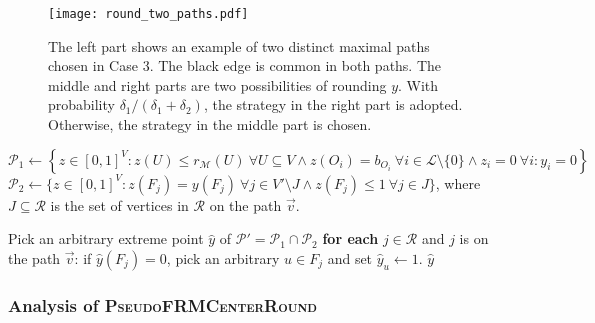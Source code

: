 \documentclass[a4paper,11pt]{article}
\newcommand{\R}{\mathcal{R}}
\newcommand{\M}{\mathcal{M}}
\renewcommand{\L}{\mathcal{L}}
\renewcommand{\P}{\mathcal{P}}
\begin{document}
\begin{figure}[H]
\centering
\texttt{[image: round\_two\_paths.pdf]}
        \caption{The left part shows an example of two distinct maximal paths chosen in Case 3. The black edge is common in both paths. The middle and right parts are two possibilities of rounding $y$. With probability $\delta_1/(\delta_1+\delta_2)$, the strategy in the right part is adopted. Otherwise, the strategy in the middle part is chosen.}
        \label{fig:two_paths}
\end{figure}

\begin{algorithm}[H]
\caption{$\textsc{RoundFinalPath}\left(y, \vec{v} \right)$}
\begin{algorithmic}[1]
\STATE $\P_1 \gets  \left\{z \in [0,1]^V: z(U) \leq r_\M(U) ~\forall U \subseteq V \wedge z(O_i) = b_{O_i}  ~\forall i \in \L\setminus\{0\} \wedge z_i=0 ~\forall i:y_i=0 \right\}$
\STATE $\P_2 \gets \{z \in [0,1]^V:  z(F_j) = y(F_j) ~\forall j \in V'\setminus J \wedge z(F_j) \leq 1 ~\forall j \in J \}$, where $J \subseteq \R$ is the set of vertices in $\R$ on the path $\vec{v}$.

\STATE Pick an arbitrary extreme point $\hat{y}$ of $\P' = \P_1 \cap \P_2$
\STATE \textbf{for each} $j \in \R$ and $j$ is on the path $\vec{v}$: if $\hat{y}(F_j) = 0$, pick an arbitrary $u \in F_j$ and set $\hat{y}_u \gets 1$.
\RETURN $\hat{y}$
\end{algorithmic} 
\label{algo:round_final_path}
\end{algorithm}

\subsubsection{Analysis of \textsc{PseudoFRMCenterRound}}
\end{document}
